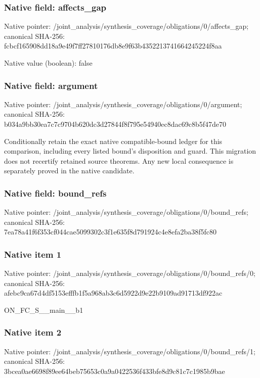 \documentclass[10pt,a4paper]{article}
\begin{document}
\subsubsection{Native field: affects\_\allowbreak{}gap}
Native pointer: /joint\_\allowbreak{}analysis/synthesis\_\allowbreak{}coverage/obligations/0/affects\_\allowbreak{}gap; canonical SHA-256: fcbcf165908dd18a9e49f7ff27810176db8e9f63b4352213741664245224f8aa

Native value (boolean): false

\subsubsection{Native field: argument}
Native pointer: /joint\_\allowbreak{}analysis/synthesis\_\allowbreak{}coverage/obligations/0/argument; canonical SHA-256: b034a9bb30ea7c7c9704b620dc3d27844f8f795e54940ec8dac69c8b5f47de70

\begingroup\raggedright\sloppy Conditionally retain the exact native compatible-bound ledger for this comparison,\allowbreak{} including every listed bound's disposition and guard. This migration does not recertify retained source theorems. Any new local consequence is separately proved in the native candidate.\par\endgroup

\subsubsection{Native field: bound\_\allowbreak{}refs}
Native pointer: /joint\_\allowbreak{}analysis/synthesis\_\allowbreak{}coverage/obligations/0/bound\_\allowbreak{}refs; canonical SHA-256: 7ea78a41f6f353cf044cae5099302c3f1e635f8d791924c4e8efa2ba38f5fc80

\subsubsection{Native item 1}
Native pointer: /joint\_\allowbreak{}analysis/synthesis\_\allowbreak{}coverage/obligations/0/bound\_\allowbreak{}refs/0; canonical SHA-256: afebc9ca67d4df5153efffb1f5a968ab3c6d5922d9e22b9109ad91713df922ac

\begingroup\raggedright\sloppy ON\_\allowbreak{}FC\_\allowbreak{}S\_\allowbreak{}\_\allowbreak{}main\_\allowbreak{}\_\allowbreak{}b1\par\endgroup

\subsubsection{Native item 2}
Native pointer: /joint\_\allowbreak{}analysis/synthesis\_\allowbreak{}coverage/obligations/0/bound\_\allowbreak{}refs/1; canonical SHA-256: 3bcea0ae6698f89ee64beb75653c0a9a0422536f433bfe8d9c81c7c1985b9bae
\end{document}
